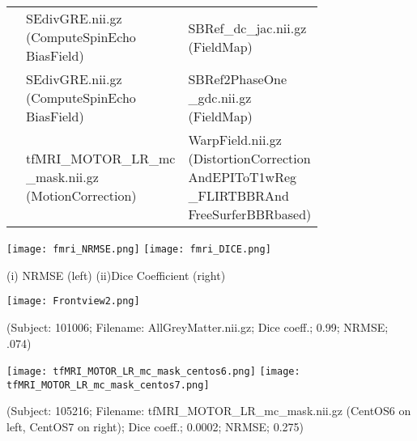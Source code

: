 \begin{center}
\begin{longtable}{|p{}|p{}|p{}|}
& \makecell[l]{SEdivGRE.nii.gz\\(ComputeSpinEcho\\BiasField)}                         & \makecell[l]{SBRef\_dc\_jac.nii.gz\\(FieldMap)} \\\cline{2-3}
& \makecell[l]{SEdivGRE.nii.gz\\(ComputeSpinEcho\\BiasField)}                         & \makecell[l]{SBRef2PhaseOne\\\_gdc.nii.gz\\(FieldMap)} \\\cline{2-3}
& \makecell[l]{tfMRI\_MOTOR\_LR\_mc\\\_mask.nii.gz\\(MotionCorrection)}               & \makecell[l]{WarpField.nii.gz\\(DistortionCorrection\\AndEPIToT1wReg\\\_FLIRTBBRAnd\\FreeSurferBBRbased)} \\\cline{1-3}
\end{longtable}
\label{tab:fMRIVolume_comparison_table}
\end{center}
\hfill \break

\begin{center}
\texttt{[image: fmri\_NRMSE.png]}%
\texttt{[image: fmri\_DICE.png]}
\caption*{(i) NRMSE (left) (ii)Dice Coefficient (right)}
\label{fig:fMRI_metric_values}
\end{center}

\hfill \break
\begin{center}
\texttt{[image: Frontview2.png]}%
\caption*{(Subject: 101006; Filename: AllGreyMatter.nii.gz; Dice coeff.; 0.99; NRMSE; .074)}
\label{fig:allgrey_matter} 
\end{center}

\begin{center}
\texttt{[image: tfMRI\_MOTOR\_LR\_mc\_mask\_centos6.png]}%
\texttt{[image: tfMRI\_MOTOR\_LR\_mc\_mask\_centos7.png]}
\caption*{(Subject: 105216; Filename: tfMRI\_MOTOR\_LR\_mc\_mask.nii.gz (CentOS6 on left, CentOS7 on right); Dice coeff.; 0.0002; NRMSE; 0.275)}
\label{fig:tfMRI_mask_file}
\end{center}

